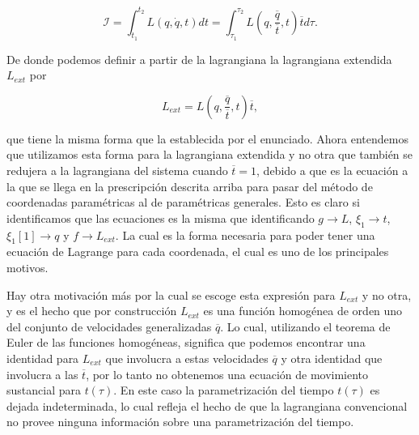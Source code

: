 \documentclass[a4paper,10pt]{article}
\numberwithin{equation}{section}
\begin{document}
\begin{equation}
 \mathcal{I} = \int_{t_1}^{t_2} L(q,\dot{q},t)dt = 
 \int_{\tau_1}^{\tau_2} L\left(q,\frac{\overline{q}}{\overline{t}},t\right)\overline{t}d\tau.
\end{equation}

De donde podemos definir a partir de la lagrangiana  
la lagrangiana extendida $L_{ext}$ por 

\begin{equation}
 L_{ext} = L(q,\frac{\overline{q}}{\overline{t}},t)\overline{t},
 \label{eq:6lagrangianaExt}
\end{equation}

que tiene la misma forma que la establecida por el enunciado. Ahora entendemos que 
utilizamos esta forma para la lagrangiana extendida y no otra que también se redujera
a la lagrangiana del sistema cuando $\overline{t} = 1$, debido  a que 
es la ecuación a la que se llega en la prescripción descrita arriba para pasar del método 
de coordenadas paramétricas al de paramétricas generales. Esto es claro si identificamos 
que las ecuaciones  es la misma que  
identificando $g\rightarrow L$, $\xi_1 \rightarrow t$, $\xi_1{[1]} \rightarrow q$ y 
$f \rightarrow L_{ext}$. La cual es la forma necesaria para poder tener una ecuación 
de Lagrange para cada coordenada, el cual es uno de los principales motivos. 

\vspace{.3cm}

Hay otra motivación más por la cual se escoge esta expresión para $L_{ext}$ y no otra,
y es el hecho que por construcción $L_{ext}$ es una función homogénea de orden uno 
del conjunto de velocidades generalizadas $\overline{q}$. Lo cual, utilizando 
el teorema de Euler de las funciones homogéneas, significa que podemos encontrar 
una identidad para $L_{ext}$ que involucra a estas velocidades $\overline{q}$ y otra
identidad que involucra a las $\overline{t}$, por lo tanto no obtenemos una ecuación 
de movimiento sustancial para $t(\tau)$. En este caso la parametrización del 
tiempo $t(\tau)$ es dejada indeterminada, lo cual refleja el hecho de que la lagrangiana 
convencional no provee ninguna información sobre una parametrización del tiempo.

\vspace{.3cm}
\end{document}

